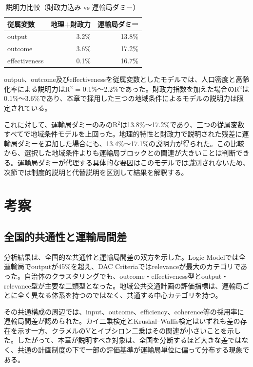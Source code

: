 \begin{table}[htbp]
\caption{説明力比較（財政力込み vs 運輸局ダミー）}
\label{tab:r2_comparison_fiscal}
\centering
\begin{tabular}{lrr}
\toprule
従属変数 & 地理+財政力 & 運輸局ダミー \\
\midrule
output & 3.2\% & 13.8\% \\
outcome & 3.6\% & 17.2\% \\
effectiveness & 0.1\% & 16.7\% \\
\bottomrule
\end{tabular}
\end{table}

output、outcome及びeffectivenessを従属変数としたモデルでは、人口密度と高齢化率による説明力はR$^2$ = 0.1\%〜2.2\%であった。財政力指数を加えた場合のR$^2$は0.1\%〜3.6\%であり、本章で採用した三つの地域条件によるモデルの説明力は限定されている。

これに対して、運輸局ダミーのみのR$^2$は13.8\%〜17.2\%であり、三つの従属変数すべてで地域条件モデルを上回った。地理的特性と財政力で説明された残差に運輸局ダミーを追加した場合にも、13.4\%〜17.1\%の説明力が得られた。この比較から、選択した地域条件よりも運輸局ブロックとの関連が大きいことは判断できる。運輸局ダミーが代理する具体的な要因はこのモデルでは識別されないため、次節では制度的説明と代替説明を区別して結果を解釈する。

\section{考察}
\label{sec:ch6_discussion}

\subsection{全国的共通性と運輸局間差}

分析結果は、全国的な共通性と運輸局間差の双方を示した。Logic Modelでは全運輸局でoutputが45\%を超え、DAC Criteriaではrelevanceが最大のカテゴリであった。自治体のクラスタリングでも、outcome・effectiveness型とoutput・relevance型が主要な二類型となった。地域公共交通計画の評価指標は、運輸局ごとに全く異なる体系を持つのではなく、共通する中心カテゴリを持つ。

その共通構成の周辺では、input、outcome、efficiency、coherence等の採用率に運輸局間差が認められた。カイ二乗検定とKruskal--Wallis検定はいずれも差の存在を示す一方、クラメルのVとイプシロン二乗はその関連が小さいことを示した。したがって、本章が説明すべき対象は、全国を分断するほど大きな差ではなく、共通の計画制度の下で一部の評価基準が運輸局単位に偏って分布する現象である。

